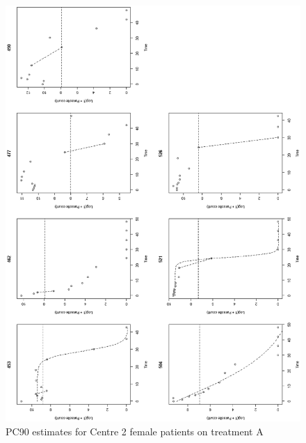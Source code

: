 \begin{figure}
\includegraphics[scale=0.50]{logistic-2FA.eps} 
\caption{PC90 estimates for Centre 2 female patients on treatment A}\label{2FA}
\end{figure}
